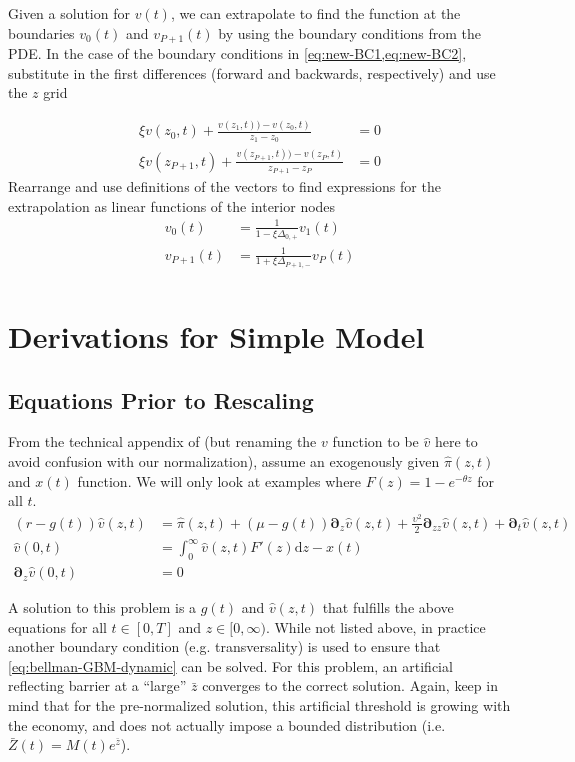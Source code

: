 \documentclass[11pt]{article}
\newcommand{\D}[1][]{\ensuremath{\boldsymbol{\partial}_{#1}}}
\newcommand{\diff}{\ensuremath{\mathrm{d}}}
\begin{document}
Given a solution for $v(t)$, we can extrapolate to find the function at the boundaries $v_0(t)$ and $v_{P+1}(t)$ by using the boundary conditions from the PDE.  In the case of the boundary conditions in \cref{eq:new-BC1,eq:new-BC2}, substitute in the first differences (forward and backwards, respectively) and use the $z$ grid

\begin{align}
	\xi v(z_0, t) + \frac{v(z_1,t)) - v(z_0,t)}{z_1 - z_0} &= 0\\
	\xi v(z_{P+1},t) + \frac{v(z_{P+1},t)) - v(z_P,t)}{z_{P+1} - z_P} &= 0
\end{align}
Rearrange and use definitions of the vectors to find expressions for the extrapolation as linear functions of the interior nodes
\begin{align}
	v_0(t) &= \frac{1}{1 - \xi \Delta_{0,+}}v_1(t)\\
	v_{P+1}(t) &= \frac{1}{1 + \xi \Delta_{P+1,-}}v_P(t)\\
\end{align}


\section{Derivations for Simple Model}\label{sec:simple-derivation}
\subsection{Equations Prior to Rescaling}

From the technical appendix of \cite{BenhabibPerlaTonetti2017} (but renaming the $v$ function to be $\hat{v}$ here to avoid confusion with our normalization), assume an exogenously given $\hat{\pi}(z,t)$ and $x(t)$ function.  We will only look at examples where $F(z) = 1 - e^{-\theta z}$ for all $t$.
\begin{align}
(r - g(t)) \hat{v}(z,t) &= \hat{\pi}(z,t) + (\mu- g(t)) \D[z] \hat{v}(z,t) + \frac{\upsilon^2}{2} \D[zz] \hat{v}(z,t) + \D[t]\hat{v}(z,t)\label{eq:bellman-GBM-dynamic}	\\
\hat{v}(0,t) &= \int_{0}^{\infty} \hat{v}(z,t) F'(z)\diff z - x(t)\label{eq:vm-GBM-dynamic}\\
\D[z]\hat{v}(0,t) &= 0\label{eq:sp-GBM-dynamic}
\end{align}

A solution to this problem is a $g(t)$ and $\hat{v}(z,t)$ that fulfills the above equations for all $t\in[0,T]$ and $z\in[0,\infty)$.  While not listed above, in practice another boundary condition (e.g. transversality) is used to ensure that \cref{eq:bellman-GBM-dynamic} can be solved. For this problem, an artificial reflecting barrier at a ``large'' $\bar{z}$ converges to the correct solution.  Again, keep in mind that for the pre-normalized solution, this artificial threshold is growing with the economy, and does not actually impose a bounded distribution (i.e. $\bar{Z}(t) = M(t) e^{\bar{z}}$).
\end{document}
